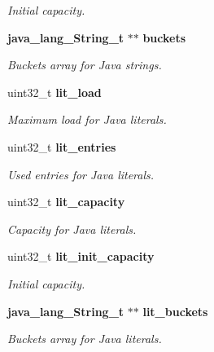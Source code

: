 \begin{DoxyCompactItemize}
\begin{DoxyCompactList}\small\item\em Initial capacity. \item\end{DoxyCompactList}\item 
{\bf java\_\-lang\_\-String\_\-t} $\ast$$\ast$ {\bf buckets}\label{structjstring__manager__t_a07c91d2299fb23d27e552e3f259668a6}

\begin{DoxyCompactList}\small\item\em Buckets array for Java strings. \item\end{DoxyCompactList}\item 
uint32\_\-t {\bf lit\_\-load}\label{structjstring__manager__t_a724f319ce271764c5648c8a6f4675882}

\begin{DoxyCompactList}\small\item\em Maximum load for Java literals. \item\end{DoxyCompactList}\item 
uint32\_\-t {\bf lit\_\-entries}\label{structjstring__manager__t_a038e612e5afa11fd90e16787fd8b174f}

\begin{DoxyCompactList}\small\item\em Used entries for Java literals. \item\end{DoxyCompactList}\item 
uint32\_\-t {\bf lit\_\-capacity}\label{structjstring__manager__t_a956aeb00f113d9b68ee1f72cbbbaa0c5}

\begin{DoxyCompactList}\small\item\em Capacity for Java literals. \item\end{DoxyCompactList}\item 
uint32\_\-t {\bf lit\_\-init\_\-capacity}\label{structjstring__manager__t_a1fb652d8797e1a1f2839271ea724df80}

\begin{DoxyCompactList}\small\item\em Initial capacity. \item\end{DoxyCompactList}\item 
{\bf java\_\-lang\_\-String\_\-t} $\ast$$\ast$ {\bf lit\_\-buckets}\label{structjstring__manager__t_acc0f46caac15027785b2751687faf71a}

\begin{DoxyCompactList}\small\item\em Buckets array for Java literals. \item\end{DoxyCompactList}\end{DoxyCompactItemize}


